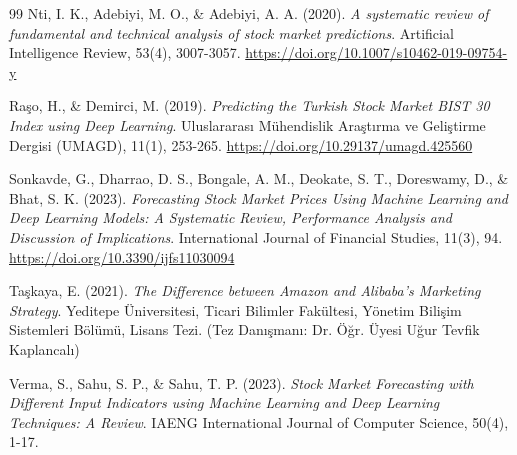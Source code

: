 \documentclass[12pt,a4paper]{report}
\begin{document}
\begin{thebibliography}{99}
Nti, I. K., Adebiyi, M. O., \& Adebiyi, A. A. (2020). \emph{A systematic review of fundamental and technical analysis of stock market predictions}. Artificial Intelligence Review, 53(4), 3007-3057. \url{https://doi.org/10.1007/s10462-019-09754-y}

Raşo, H., \& Demirci, M. (2019). \emph{Predicting the Turkish Stock Market BIST 30 Index using Deep Learning}. Uluslararası Mühendislik Araştırma ve Geliştirme Dergisi (UMAGD), 11(1), 253-265. \url{https://doi.org/10.29137/umagd.425560}

Sonkavde, G., Dharrao, D. S., Bongale, A. M., Deokate, S. T., Doreswamy, D., \& Bhat, S. K. (2023). \emph{Forecasting Stock Market Prices Using Machine Learning and Deep Learning Models: A Systematic Review, Performance Analysis and Discussion of Implications}. International Journal of Financial Studies, 11(3), 94. \url{https://doi.org/10.3390/ijfs11030094}

Taşkaya, E. (2021). \emph{The Difference between Amazon and Alibaba's Marketing Strategy}. Yeditepe Üniversitesi, Ticari Bilimler Fakültesi, Yönetim Bilişim Sistemleri Bölümü, Lisans Tezi. (Tez Danışmanı: Dr. Öğr. Üyesi Uğur Tevfik Kaplancalı)

Verma, S., Sahu, S. P., \& Sahu, T. P. (2023). \emph{Stock Market Forecasting with Different Input Indicators using Machine Learning and Deep Learning Techniques: A Review}. IAENG International Journal of Computer Science, 50(4), 1-17.

\end{thebibliography}
\end{document}
